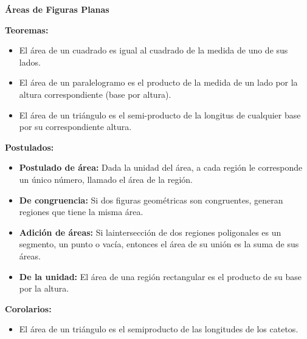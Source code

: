 \documentclass[•]{article}
\begin{document}
	\begin{center}
		\begin{huge}
			\textbf{\'Areas de Figuras Planas}
		\end{huge}
	\end{center}
	
	\begin{flushleft}
		\textbf{Teoremas:}
		\begin{itemize}
			\item El \'area de un cuadrado es igual al cuadrado de la medida de uno de sus lados. 
			\item El \'area de un paralelogramo es el producto de la medida de un lado por la altura correspondiente (base por altura).
			\item El \'area de un tri\'angulo es el semi-producto de la longitus de cualquier base por su correspondiente altura.
		\end{itemize}
		
		
		\textbf{Postulados: }
		\begin{itemize}
			\item \textbf{Postulado de \'area:} Dada la unidad del \'area, a cada regi\'on le corresponde un \'unico n\'umero, llamado el \'area de la regi\'on.
			\item \textbf{De congruencia: }Si dos figuras geom\'etricas son congruentes, generan regiones que tiene la misma \'area.
			\item \textbf{Adici\'on de \'areas: }Si laintersecci\'on de dos regiones poligonales es un segmento, un punto o vac\'ia, entonces el \'area de su uni\'on es la suma de sus \'areas.
			\item \textbf{De la unidad: }El \'area de una regi\'on rectangular es el producto de su base por la altura.
		\end{itemize}
		
		
		
		\textbf{Corolarios: }
		\begin{itemize}
			\item El \'area de un tri\'angulo es el semiproducto de las longitudes de los catetos. 
		\end{itemize}
	\end{flushleft}
\end{document}
